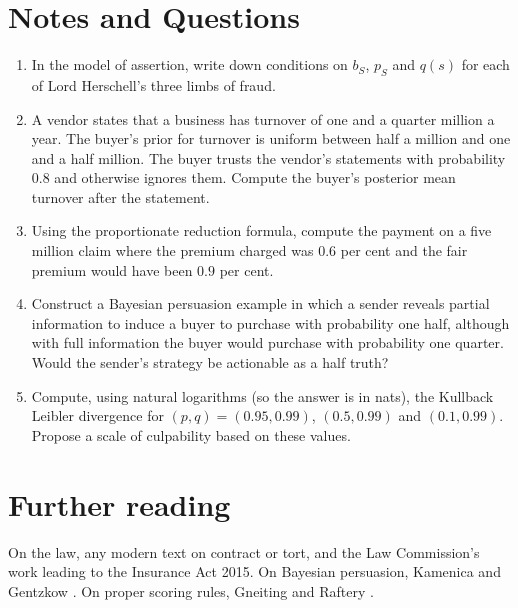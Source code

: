\section*{Notes and Questions}
\begin{enumerate}[label=\arabic*.]
\item In the model of assertion, write down conditions on $b_S$, $p_S$ and $q(s)$ for each of Lord Herschell's three limbs of fraud.
\item A vendor states that a business has turnover of one and a quarter million a year. The buyer's prior for turnover is uniform between half a million and one and a half million. The buyer trusts the vendor's statements with probability $0.8$ and otherwise ignores them. Compute the buyer's posterior mean turnover after the statement.
\item Using the proportionate reduction formula, compute the payment on a five million claim where the premium charged was $0.6$ per cent and the fair premium would have been $0.9$ per cent.
\item Construct a Bayesian persuasion example in which a sender reveals partial information to induce a buyer to purchase with probability one half, although with full information the buyer would purchase with probability one quarter. Would the sender's strategy be actionable as a half truth?
\item Compute, using natural logarithms (so the answer is in nats), the Kullback Leibler divergence for $(p, q) = (0.95, 0.99)$, $(0.5, 0.99)$ and $(0.1, 0.99)$. Propose a scale of culpability based on these values.
\end{enumerate}

\section*{Further reading}
On the law, any modern text on contract or tort, and the Law Commission's work leading to the Insurance Act 2015. On Bayesian persuasion, Kamenica and Gentzkow \citep{kamenica2011}. On proper scoring rules, Gneiting and Raftery \citep{gneiting2007}.
